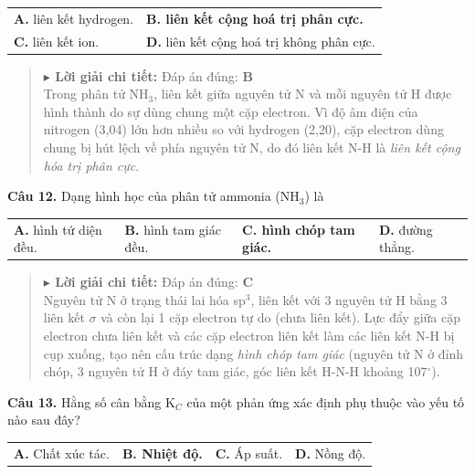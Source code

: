 \documentclass[11pt,a4paper]{article}
\begin{document}
\begin{tabularx}{\textwidth}{@{}XX@{}}
\textbf{A.} liên kết hydrogen. & \textbf{\color{red} B. liên kết cộng hoá trị phân cực.} \\
\textbf{C.} liên kết ion. & \textbf{D.} liên kết cộng hoá trị không phân cực. \\
\end{tabularx}

\begin{quote}\small
{\color{myBlue}\textbf{$\blacktriangleright$ Lời giải chi tiết:}} Đáp án đúng: \textbf{\color{red} B}\\
Trong phân tử NH$_{3}$, liên kết giữa nguyên tử N và mỗi nguyên tử H được hình thành do sự dùng chung một cặp electron. Vì độ âm điện của nitrogen (3,04) lớn hơn nhiều so với hydrogen (2,20), cặp electron dùng chung bị hút lệch về phía nguyên tử N, do đó liên kết N-H là \textit{liên kết cộng hóa trị phân cực}.
\end{quote}
\vspace{2pt}

\textbf{Câu 12.} Dạng hình học của phân tử ammonia (NH$_{3}$) là

\begin{tabularx}{\textwidth}{@{}XXXX@{}}
\textbf{A.} hình tứ diện đều. & \textbf{B.} hình tam giác đều. & \textbf{\color{red} C. hình chóp tam giác.} & \textbf{D.} đường thẳng. \\
\end{tabularx}

\begin{quote}\small
{\color{myBlue}\textbf{$\blacktriangleright$ Lời giải chi tiết:}} Đáp án đúng: \textbf{\color{red} C}\\
Nguyên tử N ở trạng thái lai hóa sp$^{3}$, liên kết với 3 nguyên tử H bằng 3 liên kết $\sigma$ và còn lại 1 cặp electron tự do (chưa liên kết). Lực đẩy giữa cặp electron chưa liên kết và các cặp electron liên kết làm các liên kết N-H bị cụp xuống, tạo nên cấu trúc dạng \textit{hình chóp tam giác} (nguyên tử N ở đỉnh chóp, 3 nguyên tử H ở đáy tam giác, góc liên kết H-N-H khoảng 107$^\circ$).
\end{quote}
\vspace{2pt}

\textbf{Câu 13.} Hằng số cân bằng K$_{C}$ của một phản ứng xác định phụ thuộc vào yếu tố nào sau đây?

\begin{tabularx}{\textwidth}{@{}XXXX@{}}
\textbf{A.} Chất xúc tác. & \textbf{\color{red} B. Nhiệt độ.} & \textbf{C.} Áp suất. & \textbf{D.} Nồng độ. \\
\end{tabularx}
\end{document}
